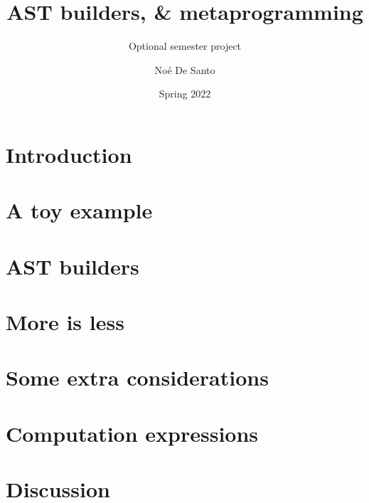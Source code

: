 \documentclass[sigplan,screen,nonacm,natbib=false]{acmart}
\title{AST builders, \Scala{} \& metaprogramming}
\subtitle{Optional semester project}
\author{Noé De Santo}
\date{Spring 2022}
\begin{document}
    \maketitle

    \section{Introduction}
    

    \section{A toy example}
    

    \section{AST builders}
    

    \section{More is less}
    

    \section{Some extra considerations}
    

    \section{Computation expressions}
    

    \section{Discussion}
    

    \printbibliography
\end{document}
